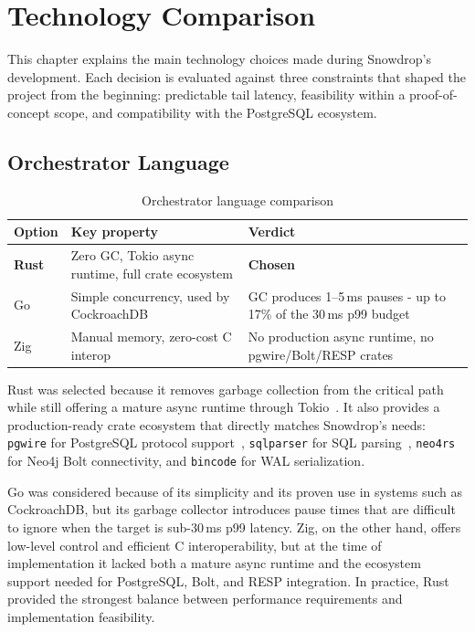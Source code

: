 %
%
\chapter{Technology Comparison}
\label{chap:tech-comparison}
\setlength{\parskip}{1em}

This chapter explains the main technology choices made during Snowdrop’s development. Each decision is evaluated against three constraints that shaped the project from the beginning: predictable tail latency, feasibility within a proof-of-concept scope, and compatibility with the PostgreSQL ecosystem.

\section{Orchestrator Language}

\begin{table}[H]
\centering
\caption{Orchestrator language comparison}
\label{tab:lang-comparison}
\renewcommand{\arraystretch}{1.4}
\begin{tabular}{|l|p{4cm}|p{5.5cm}|}
\hline
\textbf{Option} & \textbf{Key property} & \textbf{Verdict} \\
\hline
\textbf{Rust} & Zero GC, Tokio async runtime, full crate ecosystem & \textbf{Chosen} \\
\hline
Go & Simple concurrency, used by CockroachDB & GC produces 1--5\,ms pauses - up to 17\% of the 30\,ms p99 budget \\
\hline
Zig & Manual memory, zero-cost C interop & No production async runtime, no pgwire/Bolt/RESP crates \\
\hline
\end{tabular}
\end{table}

Rust was selected because it removes garbage collection from the critical path while still offering a mature async runtime through Tokio~\cite{tokio2025}. It also provides a production-ready crate ecosystem that directly matches Snowdrop’s needs: \texttt{pgwire} for PostgreSQL protocol support~\cite{pgwire2025}, \texttt{sqlparser} for SQL parsing~\cite{sqlparser2025}, \texttt{neo4rs} for Neo4j Bolt connectivity, and \texttt{bincode} for WAL serialization.

Go was considered because of its simplicity and its proven use in systems such as CockroachDB, but its garbage collector introduces pause times that are difficult to ignore when the target is sub-30\,ms p99 latency. Zig, on the other hand, offers low-level control and efficient C interoperability, but at the time of implementation it lacked both a mature async runtime and the ecosystem support needed for PostgreSQL, Bolt, and RESP integration. In practice, Rust provided the strongest balance between performance requirements and implementation feasibility.

